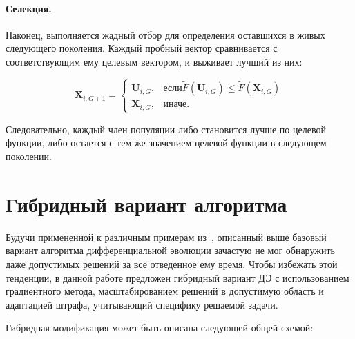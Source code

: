\paragraph*{Селекция.}

Наконец, выполняется жадный отбор для определения оставшихся в живых следующего поколения. Каждый пробный вектор сравнивается с соответствующим ему целевым вектором, и выживает лучший из них:

\begin{equation}\label{eq:de_sel}
  \textbf{X}_{i,G+1} =
  \begin{cases}
    \textbf{U}_{i,G}, & \mbox{если} \tilde{F}(\textbf{U}_{i,G}) \leq \tilde{F}(\textbf{X}_{i,G}) \\
    \textbf{X}_{i,G}, & \mbox{иначе}.
  \end{cases}
\end{equation}

Следовательно, каждый член популяции либо становится лучше по целевой функции, либо остается с тем же значением целевой функции в следующем поколении.

\section{Гибридный вариант алгоритма}
Будучи примененной к различным примерам из~\cite{tyu:daor}, описанный выше базовый вариант алгоритма  дифференциальной эволюции зачастую не мог обнаружить даже допустимых решений за все отведенное ему время. Чтобы избежать этой тенденции, в данной работе предложен гибридный вариант ДЭ с использованием градиентного метода, масштабированием решений в допустимую область и адаптацией штрафа, учитывающий специфику решаемой задачи.

Гибридная модификация может быть описана следующей общей схемой:

